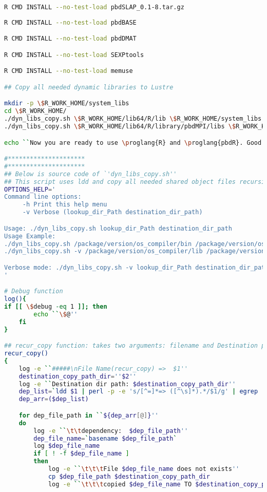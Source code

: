 \begin{lstlisting}[language=bash]
R CMD INSTALL --no-test-load pbdSLAP_0.1-8.tar.gz
 
R CMD INSTALL --no-test-load pbdBASE

R CMD INSTALL --no-test-load pbdDMAT

R CMD INSTALL --no-test-load SEXPtools

R CMD INSTALL --no-test-load memuse

## Copy all needed dynamic libraries to Lustre 

mkdir -p \$R_WORK_HOME/system_libs
cd \$R_WORK_HOME/
./dyn_libs_copy.sh \$R_WORK_HOME/lib64/R/lib \$R_WORK_HOME/system_libs
./dyn_libs_copy.sh \$R_WORK_HOME/lib64/R/library/pbdMPI/libs \$R_WORK_HOME/system_libs

echo ``Now you are ready to use \proglang{R} and \proglang{pbdR}. Good Luck !!!''

#*********************
#*********************
## Below is source code of `'dyn_libs_copy.sh''
## This script uses ldd and copy all needed shared object files recursively
OPTIONS_HELP='
Command line options:
     -h Print this help menu
     -v Verbose (lookup_dir_Path destination_dir_path)

Usage: ./dyn_libs_copy.sh lookup_dir_Path destination_dir_path
Usage Example:
./dyn_libs_copy.sh /package/version/os_compiler/bin /package/version/os_compiler/system_libs
./dyn_libs_copy.sh -v /package/version/os_compiler/lib /package/version/os_compiler/system_libs

Verbose mode: ./dyn_libs_copy.sh -v lookup_dir_Path destination_dir_path
'

# Debug function
log(){
if [[ \$debug -eq 1 ]]; then
        echo ``\$@''
    fi
}

## recur_copy function: takes two arguments: filename and Destination path
recur_copy()
{
    log -e ``#####\nFile Name(recur_copy) =>  $1''
    destination_copy_path_dir=''$2''
    log -e ``Destination dir path: $destination_copy_path_dir''
    dep_list=`ldd $1 | perl -p -e 's/[^=]*=> ([^\s]*).*/$1/g' | egrep '^\/.*'`
    dep_arr=($dep_list)

    for dep_file_path in ``${dep_arr[@]}''
    do
        log -e ``\t\tdependency:  $dep_file_path''
        dep_file_name=`basename $dep_file_path`
        log $dep_file_name
        if [ ! -f $dep_file_name ]
        then
            log -e ``\t\t\tFile $dep_file_name does not exists''
            cp $dep_file_path $destination_copy_path_dir
            log -e ``\t\t\tcopied $dep_file_name TO $destination_copy_path_dir''


\end{lstlisting}
